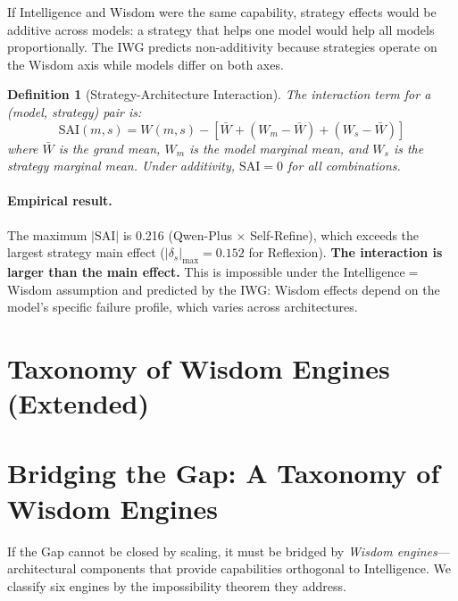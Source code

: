 \documentclass{article}
\newtheorem{definition}{Definition}
\begin{document}
If Intelligence and Wisdom were the same capability, strategy effects
would be additive across models: a strategy that helps one model would
help all models proportionally. The IWG predicts non-additivity because
strategies operate on the Wisdom axis while models differ on both axes.

\begin{definition}[Strategy-Architecture Interaction]
\label{def:sai}
The interaction term for a (model, strategy) pair is:
\begin{equation}
  \text{SAI}(m, s) = W(m, s) - \left[\bar{W} + (W_m - \bar{W}) + (W_s - \bar{W})\right]
\end{equation}
where $\bar{W}$ is the grand mean, $W_m$ is the model marginal mean,
and $W_s$ is the strategy marginal mean. Under additivity,
$\text{SAI} = 0$ for all combinations.
\end{definition}

\paragraph{Empirical result.}
The maximum $|\text{SAI}|$ is 0.216 (Qwen-Plus $\times$ Self-Refine),
which exceeds the largest strategy main effect ($|\delta_s|_{\max} = 0.152$
for Reflexion). \textbf{The interaction is larger than the main effect.}
This is impossible under the Intelligence$=$Wisdom assumption and
predicted by the IWG: Wisdom effects depend on the model's specific
failure profile, which varies across architectures.



\section{Taxonomy of Wisdom Engines (Extended)}
\label{app:taxonomy}
\section{Bridging the Gap: A Taxonomy of Wisdom Engines}
\label{sec:engines}

If the Gap cannot be closed by scaling, it must be bridged by
\emph{Wisdom engines}---architectural components that provide capabilities
orthogonal to Intelligence. We classify six engines by the impossibility
theorem they address.
\end{document}
